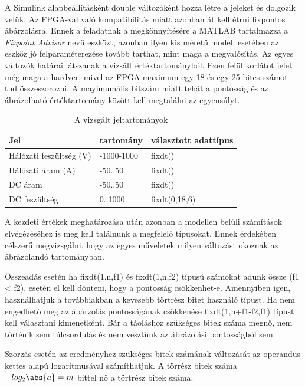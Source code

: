 A Simulink alapbeállításként double változóként hozza létre a jeleket és dolgozik velük. Az FPGA-val való kompatibilitás miatt azonban át kell étrni fixpontos ábárzolásra. Ennek a feladatnak a megkönnyítésére a MATLAB tartalmazza a \emph{Fixpoint Advisor} nevű eszközt, azonban ilyen kis méretű modell esetében az eszköz jó felparaméterezése tovább tarthat, mint maga a megvalósítás. Az egyes változók határai látszanak a vizsált értéktartományból. Ezen felül korlátot jelet még maga a hardver, mivel az FPGA maximum egy 18 és egy 25 bites számot tud összeszorozni. A mayimumális bitszám miatt tehát a pontosság és az ábrázolható értéktartomány között kell megtalálni az egyensúlyt.

\begin{table}[]
\centering
\begin{tabular}{|l|l|l|}
\hline
Jel  					&		 tartomány              & választott adattípus \\ \hline
Hálózati feszültség (V) & -1000-1000          	 		& fixdt()\\ \hline
Hálózati áram (A) 		& -50..50						& fixdt()\\ \hline
DC áram 				& -50..50        	   	   		& fixdt() \\ \hline
DC feszültség  			& 0..1000     			 		& fixdt(0,18,6)    \\ \hline
\end{tabular}
\caption{A vizsgált jeltartományok}
\label{tab:values}
\end{table} 

A kezdeti értékek meghatározása után azonban a modellen belüli számítások elvégézéséhez is meg kell találnunk a megfelelő típusokat. Ennek érdekében célszerű megvizsgálni, hogy az egyes műveletek milyen változást okoznak az ábrázolandó tartományban.

Összeadás esetén ha fixdt(1,n,f1) és fixdt(1,n,f2) típusú számokat adunk össze (f1 < f2), esetén el kell dönteni, hogy a pontosság csökkenhet-e. Amennyiben igen, használhatjuk a továbbiakban a kevesebb törtrész bitet használó típust. Ha nem engedhető meg az ábárzolás pontosságának csökkenése fixdt(1,n+f1-f2,f1) típust kell választani kimenetként. Bár a táoláshoz szükséges bitek száma megnő, nem történik sem túlcsordulás és nem vesztünk az ábrázolási pontosságból sem.

Szorzás esetén az eredményhez szükséges bitek számának változását az operandus kettes alapú logaritmusával számíthatjuk. A törrész bitek száma $-log_2\abs{a} = m$ bittel nő a törtrész bitek száma.

